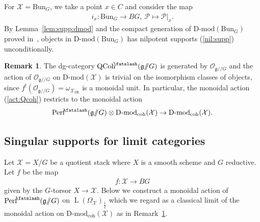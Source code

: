 \documentclass [11pt,oneside,a4paper,mathscr]{amsart}
\theoremstyle{definition}
\newtheorem{remark}[thm]{Remark}
\newcommand{\LL}{\operatorname{L}}
\newcommand{\QCoh}{\operatorname{QCoh}}
\newcommand{\X}{\mathcal{X}}
\newcommand{\shear}{{\mathbin{\mkern-6mu\fatslash}}}
\newcommand{\ssslash}{/\!\!/}
\newcommand{\Bun}{\mathrm{Bun}}
\begin{document}
For $\mathcal{X}=\Bun_G$, 
we take a point $x\in C$ and consider the map 
\begin{align*}
    i_x \colon \Bun_G \to BG, \ \mathscr{P}\mapsto \mathscr{P}|_{x}. 
\end{align*}
By Lemma~\ref{lem:supp:dmod} and the compact generation of 
$\text{D-mod}(\Bun_G)$ proved in~\cite{DGbun}, objects in 
$\text{D-mod}(\Bun_G)$ has nilpotent 
supports (\ref{nil:supp}) unconditionally. 

\begin{remark}\label{rmk:action}
The dg-category $\QCoh^{\shear}(\mathfrak{g}\ssslash G)$
is generated by $\mathcal{O}_{\mathfrak{g}\ssslash G}$ and the action
of $\mathcal{O}_{\mathfrak{g}\ssslash G}$
on $\text{D-mod}(\mathcal{X})$ is trivial on the isomorphism classes of objects, 
since $f^!(\mathcal{O}_{\mathfrak{g}\ssslash G})=\omega_{\mathcal{X}_{\mathrm{dR}}}$ is a
monoidal unit. 
In particular, the monoidal action (\ref{act:Qcoh}) restricts to the monoidal action 
\begin{align}\label{act:perfD}
     \mathrm{Perf}^{\shear}(\mathfrak{g}\ssslash G) \otimes 
 \text{D-mod}_{\mathrm{coh}}(\mathcal{X}) \to   \text{D-mod}_{\mathrm{coh}}(\mathcal{X}). 
\end{align}
\end{remark}




\subsection{Singular supports for limit categories}\label{subsec:ssupport}
Let $\X=X/G$ be a quotient stack where $X$ is a smooth  
scheme and $G$ reductive. Let $f$ be the map 
\begin{align}\label{map:f}
    f\colon \mathcal{X} \to BG
\end{align}
given by the $G$-torsor $X\to \mathcal{X}$. Below
we construct a monoidal action of $\mathrm{Perf}^{\shear}(\mathfrak{g}\ssslash G)$
on $\LL(\Omega_{\mathcal{X}})_{\frac{1}{2}}$ which we regard as a classical limit 
of the monoidal action on $\text{D-mod}_{\mathrm{coh}}(\mathcal{X})$ 
as in Remark~\ref{rmk:action}. 
\end{document}
